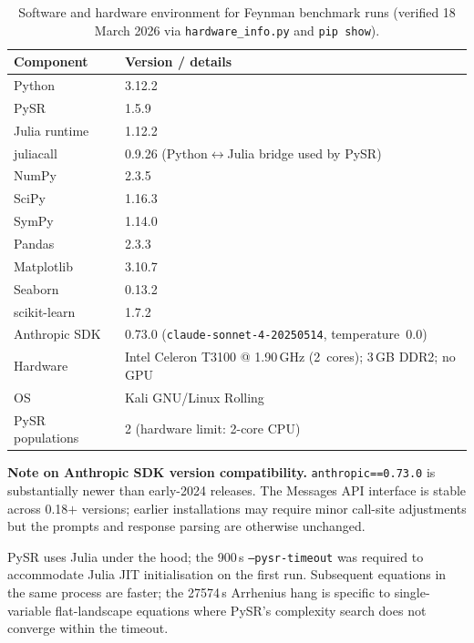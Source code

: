 \documentclass[twoside,11pt]{article}
\begin{document}
\begin{table}[H]
\centering
\caption{Software and hardware environment for Feynman benchmark runs
         (verified 18 March 2026 via \texttt{hardware\_info.py} and
         \texttt{pip show}).}
\label{tab:software_env}
\small
\begin{tabular}{ll}
\toprule
\textbf{Component} & \textbf{Version / details} \\
\midrule
Python           & 3.12.2 \\
PySR             & 1.5.9 \\
Julia runtime    & 1.12.2 \\
juliacall        & 0.9.26 (Python$\leftrightarrow$Julia bridge used by PySR) \\
NumPy            & 2.3.5 \\
SciPy            & 1.16.3 \\
SymPy            & 1.14.0 \\
Pandas           & 2.3.3 \\
Matplotlib       & 3.10.7 \\
Seaborn          & 0.13.2 \\
scikit-learn     & 1.7.2 \\
Anthropic SDK    & 0.73.0 (\texttt{claude-sonnet-4-20250514},
                   temperature~0.0) \\
\midrule
Hardware         & Intel Celeron T3100 @ 1.90\,GHz (2~cores);
                   3\,GB DDR2; no GPU \\
OS               & Kali GNU/Linux Rolling \\
PySR populations & 2 (hardware limit: 2-core CPU) \\
\bottomrule
\end{tabular}
\end{table}

\noindent\textbf{Note on Anthropic SDK version compatibility.}
\texttt{anthropic==0.73.0} is substantially newer than early-2024 releases.
The Messages API interface is stable across 0.18$+$ versions; earlier
installations may require minor call-site adjustments but the prompts and
response parsing are otherwise unchanged.

\noindent PySR uses Julia under the hood; the 900\,s
\texttt{--pysr-timeout} was required to accommodate Julia JIT
initialisation on the first run. Subsequent equations in the same process
are faster; the 27574\,s Arrhenius hang is specific to single-variable
flat-landscape equations where PySR's complexity search does not converge
within the timeout.
\end{document}
